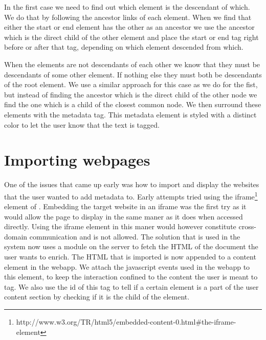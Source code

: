 In the first case we need to find out which element is the descendant of which.
We do that by following the ancestor links of each element.
When we find that either the start or end element has the other as an ancestor we use the ancestor which is the direct
child of the other element and place the start or end tag right before or after that tag, depending on which element
descended from which.

When the elements are not descendants of each other we know that they must be descendants of some other element.
If nothing else they must both be descendants of the root element.
We use a similar approach for this case as we do for the fist,
but instead of finding the ancestor which is the direct child of the other node we find the one which is a child of the
closest common node.
We then surround these elements with the metadata tag.
This metadata element is styled with a distinct color to let the user know that the text is tagged.

\section{Importing webpages}
One of the issues that came up early was how to import and display the websites that the user wanted to add metadata to.
Early attempts tried using the iframe\footnote{http://www.w3.org/TR/html5/embedded-content-0.html\#the-iframe-element}
element of .
Embedding the target website in an iframe was the first try as it would allow the page to display in the same maner
as it does when accessed directly.
Using the iframe element in this maner would however constitute cross-domain communication and is not allowed.
The solution that is used in the system now uses a module on the server to fetch the HTML of the document the user wants to enrich.
The HTML that is imported is now appended to a content element in the webapp.
We attach the javascript events used in the webapp to this element,
to keep the interaction confined to the content the user is meant to tag.
We also use the id of this tag to tell if a certain element is a part of the user content section by checking if it is
the child of the element.

